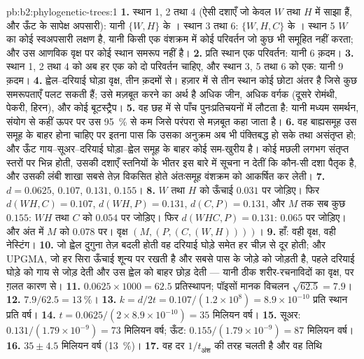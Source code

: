 \begin{solution}{pb:b2:phylogenetic-trees:1}
\textbf{1.} स्थान 1, 2 तथा 4 (ऐसी दशाएँ जो केवल $W$ तथा $H$ में साझा हैं,
और ऊँट के सापेक्ष अपसारी): यानी $\{W,H\}$ के । स्थान 3
तथा 6: $\{W,H,C\}$ के । स्थान 5 $W$ का कोई स्वअपसारी लक्षण है,
यानी किसी एक वंशक्रम में कोई परिवर्तन जो कुछ भी समूहित नहीं करता; और उस आणविक वृक्ष पर कोई स्थान
समरूप नहीं है।
\textbf{2.} प्रति स्थान एक परिवर्तन: यानी 6 क़दम।
\textbf{3.} स्थान 1, 2 तथा 4 को अब हर एक को दो परिवर्तन चाहिए, और स्थान 3, 5
तथा 6 को एक: यानी 9 क़दम।
\textbf{4.} ह्वेल--दरियाई घोड़ा वृक्ष, तीन क़दमों से। हज़ार में से
तीन स्थान कोई छोटा अंतर है जिसे कुछ समरूपताएँ पलट सकती हैं;
उसे मज़बूत करने का अर्थ है अधिक जीन, अधिक वर्गक (दूसरे
रोमंथी, पेकरी, हिरन), और कोई बूटस्ट्रैप।
\textbf{5.} वह  छह में से पाँच पुनःप्रतिचयनों में लौटता है: यानी मध्यम
समर्थन, संयोग से कहीं ऊपर पर उस \qty{95}{\%} से कम
जिसे परंपरा से मज़बूत कहा जाता है।
\textbf{6.} वह बाह्यसमूह उस समूह के बाहर होना चाहिए पर इतना पास कि
उसका अनुक्रम अब भी पंक्तिबद्ध हो सके तथा असंतृप्त हो; और ऊँट
गाय--सूअर--दरियाई घोड़ा--ह्वेल समूह के बाहर कोई सम-खुरीय है। कोई
मछली लगभग संतृप्त स्तरों पर भिन्न होती, उसकी दशाएँ स्तनियों के भीतर इस बारे में
सूचना न देतीं कि कौन-सी दशा पैतृक है,
और उसकी लंबी शाखा सबसे तेज़ विकसित होते अंतःसमूह वंशक्रम को
आकर्षित कर लेती।
\textbf{7.} $d = 0.0625$, $0.107$, $0.131$, $0.155$।
\textbf{8.} $W$ तथा $H$ को ऊँचाई $0.031$ पर जोड़िए। फिर $d(WH,C) =
0.107$, $d(WH,P) = 0.131$, $d(C,P) = 0.131$, और $M$ तक सब कुछ
$0.155$: $WH$ तथा $C$ को $0.054$ पर जोड़िए। फिर $d(WHC,P) = 0.131$: $0.065$
पर जोड़िए। और अंत में $M$ को $0.078$ पर। वृक्ष $(M,(P,(C,(W,H))))$।
\textbf{9.} हाँ: वही वृक्ष, वही नेस्टिंग।
\textbf{10.} जो ह्वेल दुगुना तेज़ बदली होती वह
दरियाई घोड़े समेत हर चीज़ से दूर होती; और UPGMA, जो हर
सिरा ऊँचाई शून्य पर रखती है और सबसे पास के जोड़े को जोड़ती है, पहले दरियाई घोड़े को
गाय से जोड़ देती और उस ह्वेल को बाहर छोड़ देती --- यानी ठीक
शरीर-रचनाविदों का वृक्ष, पर ग़लत कारण से।
\textbf{11.} $0.0625\times 1000 = 62.5$ प्रतिस्थापन; पॉइसों
मानक विचलन $\sqrt{62.5} = 7.9$।
\textbf{12.} $7.9/62.5 = \qty{13}{\%}$।
\textbf{13.} $k = d/2t = 0.107/(1.2\times 10^{8}) = 8.9\times 10^{-10}$
प्रति स्थान प्रति वर्ष।
\textbf{14.} $t = 0.0625/(2\times 8.9\times 10^{-10}) = 35$ मिलियन
वर्ष।
\textbf{15.} सूअर: $0.131/(1.79\times 10^{-9}) = 73$ मिलियन वर्ष;
ऊँट: $0.155/(1.79\times 10^{-9}) = 87$ मिलियन वर्ष।
\textbf{16.} $35 \pm 4.5$ मिलियन वर्ष (\qty{13}{\%})।
\textbf{17.} वह दर $1/t_{\text{अंश}}$ की तरह चलती है और वह तिथि

\end{solution}
